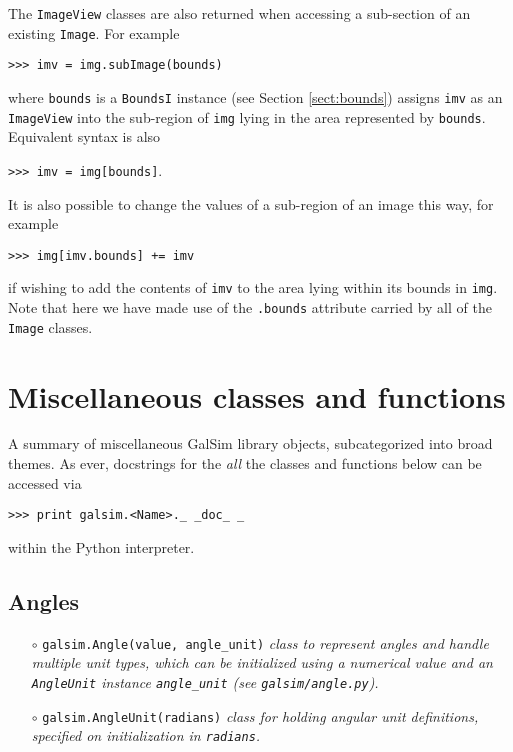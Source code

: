 \documentclass[preprint,11pt]{aastex}
\begin{document}
The \texttt{ImageView} classes are also returned when accessing a
sub-section of an existing \texttt{Image}.  For example

{\tt >>> imv = img.subImage(bounds)}

where \texttt{bounds} is a \texttt{BoundsI} instance (see Section
\ref{sect:bounds}) assigns \texttt{imv} as an \texttt{ImageView} into
the sub-region of \texttt{img} lying in the area represented
by \texttt{bounds}.  Equivalent syntax is also

{\tt >>> imv = img[bounds]}.

It is also possible to change the values of a sub-region of an image
this way, for example

{\tt >>> img[imv.bounds] += imv}

if wishing to add the contents of \texttt{imv} to the area lying
within its bounds in \texttt{img}.  Note that here we have made use of
the \texttt{.bounds} attribute carried by all of the \texttt{Image} classes.

\section{Miscellaneous classes and functions}\label{sect:misc}

A summary of miscellaneous GalSim library objects, subcategorized into
broad themes.  As ever, docstrings for the \emph{all} the classes and functions below can be accessed via

{\tt >>> print galsim.<Name>.\_\,\_doc\_\,\_}

within the Python interpreter.

\subsection{Angles}\label{sect:angles}
\begin{itemize}

\item[$\circ$] \texttt{galsim.Angle(value, angle\_unit)} \newline 
  \emph{class to represent angles and handle multiple unit types,
    which can be initialized using a numerical value and an
    \texttt{AngleUnit} instance \texttt{angle\_unit} (see \texttt{galsim/angle.py}).}

\item[$\circ$] \texttt{galsim.AngleUnit(radians)} \newline 
\emph{class for holding angular unit definitions, specified on
  initialization in \texttt{radians}.}

\end{itemize}
\end{document}
